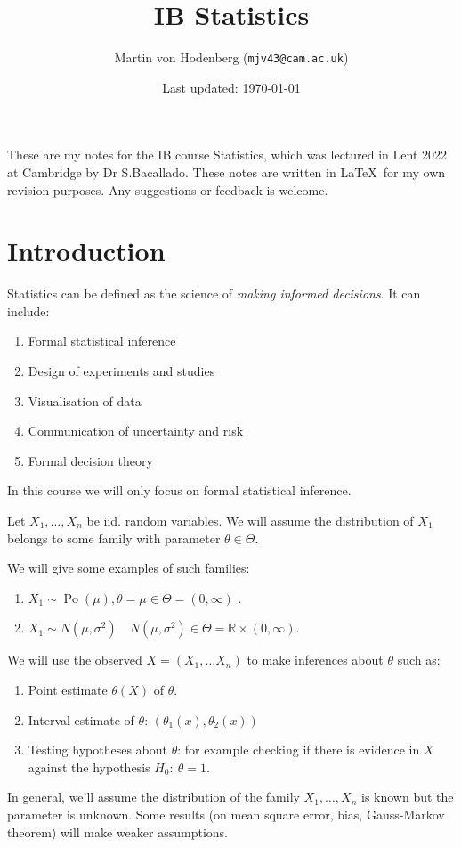 \documentclass[a4paper]{scrartcl}
\title{IB Statistics}
\author{Martin von Hodenberg (\texttt{mjv43@cam.ac.uk})}
\date{Last updated: \today}
\begin{document}
\maketitle

These are my notes for the IB course Statistics, which was lectured in Lent 2022 at Cambridge by Dr S.Bacallado. These notes are written in \LaTeX  \ for my own revision purposes. Any suggestions or feedback is welcome.
\tableofcontents
\newpage

\section{Introduction}
Statistics can be defined as the science of \emph{making informed decisions}. It can include:
\begin{enumerate}
    \item Formal statistical inference
    \item Design of experiments and studies
    \item Visualisation of data
    \item Communication of uncertainty and risk
    \item Formal decision theory
\end{enumerate}
In this course we will only focus on formal statistical inference.
\begin{definition*}
     Let $X_1 , \ldots , X_n$ be iid. random variables. We will assume the distribution of $X_1 $ belongs to some family with parameter $\theta \in \Theta$.
\end{definition*}
\begin{example*}
    We will give some examples of such families:
     \begin{enumerate}
         \item $X_1 \sim \operatorname{Po}(\mu), \theta=\mu \in \Theta=(0,\infty )$ .
         \item $X_1 \sim N (\mu, \sigma^2) \quad N (\mu, \sigma^2)\in \Theta=\mathbb{R} \times (0, \infty)$.
     \end{enumerate}
\end{example*}
We will use the observed $X= (X_1 , \ldots X_n)$ to make inferences about $\theta$ such as:
\begin{enumerate}
    \item Point estimate $\theta (X)$ of $\theta$.
    \item Interval estimate of $\theta$: $(\theta_1 (x),\theta_2 (x))$ 
    \item Testing hypotheses about $\theta$: for example checking if there is evidence in $X$ against the hypothesis $H_0 : \ \theta=1$.
\end{enumerate}
\begin{remark}
     In general, we'll assume the distribution of the family $X_1 , \ldots , X_n$ is known but the parameter is unknown. Some results (on mean square error, bias, Gauss-Markov theorem) will make weaker assumptions.
\end{remark}
\newpage
\end{document}
